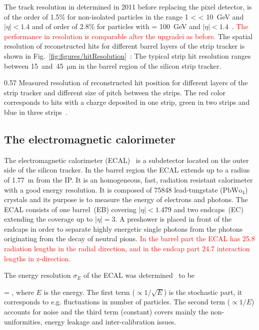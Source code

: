 The track resolution in \pt determined in 2011 before replacing the pixel detector, is of the order of 1.5\% for non-isolated particles in the range 1 < \pt < 10~GeV and $|\eta| < 1.4$ and of order of 2.8\% for particles with \pt = 100~GeV and $|\eta| < 1.4$~\cite{TRK-11-001}. \textcolor{red}{The performance in \pt resolution is comparable after the upgradei as before.} The spatial resolution of  reconstructed hits for different barrel layers of the strip tracker is shown in Fig.~\ref{fig:figures/hitResolution}~\cite{website:hitEff}: The typical strip hit resolution ranges between 15~and~45~$\mathrm{\mu m}$ in the barrel region of the silicon strip tracker.


                 {0.57}       
                 {Measured resolution of reconstructed hit position for different layers of the strip tracker and different size of pitch between the strips. The red color corresponds to hits with a charge deposited in one strip, green in two strips and blue in three strips~\cite{website:hitEff}. }

\subsection{The electromagnetic calorimeter}

The electromagnetic calorimeter (ECAL)~\cite{tdrECAL} is a subdetector located on the outer side of the silicon tracker. In the barrel region the ECAL extends up to a radius of 1.77~m from the IP. It is an homogeneous, fast, radiation resistant calorimeter with a good energy resolution. It is composed of 75848 lead-tungstate ($\mathrm{PbWo_{4}}$) crystals and its purpose is to measure the energy of electrons and photons. The ECAL consists of one barrel~(EB) covering $|\eta|<1.479$ and two endcaps~(EC) extending the coverage up to $|\eta| =3$. A preshower is placed in front of the endcaps in order to separate highly energetic single photons from the photons originating from the decay of neutral pions. \textcolor{red}{In the barrel part the ECAL has 25.8 radiation lengths in the radial direction, and in the endcap part 24.7 interaction lengths in z-direction. }

The energy resolution $\sigma_{E}$ of the ECAL was determined~\cite{Chatrchyan:2008aa} to be

{
  =  \bigoplus {}  ,
}
where $E$ is the energy. The first term ($\propto 1/\sqrt{E}$) is the stochastic part, it corresponds to e.g. fluctuations in number of particles. The second term ($\propto 1/E$) accounts for noise and the third term (constant) covers mainly the non-uniformities, energy leakage and inter-calibration issues.


